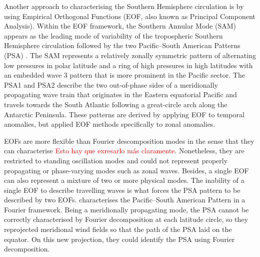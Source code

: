 \documentclass[smallextended]{svjour3}       %
\begin{document}
Another approach to characterising the Southern Hemisphere circulation is by using Empirical Orthogonal Functions (EOF, also known as Principal Component Analysis).
Within the EOF framework, the Southern Annular Mode (SAM) appears as the leading mode of variability of the tropospheric Southern Hemisphere circulation \citep{fogt2020} followed by the two Pacific--South American Patterns (PSA) \citep{mo2001}.
The SAM represents a relatively zonally symmetric pattern of alternating low pressures in polar latitude and a ring of high pressures in high latitudes with an embedded wave 3 pattern that is more prominent in the Pacific sector.
The PSA1 and PSA2 describe the two out-of-phase sides of a meridionally propagating wave train that originates in the Eastern equatorial Pacific and travels towards the South Atlantic following a great-circle arch along the Antarctic Peninsula.
These patterns are derived by applying EOF to temporal anomalies, but \citet{raphael2003} applied EOF methods specifically to zonal anomalies.

EOFs are more flexible than Fourier descomposition modes in the sense that they can characterise \textcolor{red}{Esto hay que exresarlo más claramente}.
Nonetheless, they are restricted to standing oscillation modes and could not represent properly propagating or phase-varying modes such as zonal waves.
Besides, a single EOF can also represent a mixture of two or more physical modes.
The inability of a single EOF to describe travelling waves is what forces the PSA pattern to be described by two EOFs.
\citet{irving2016} characterises the Pacific--South American Pattern in a Fourier framework.
Being a meridionally propagating mode, the PSA cannot be correctly characterised by Fourier decomposition at each latitude circle, so they reprojected meridional wind fields so that the path of the PSA laid on the equator.
On this new projection, they could identify the PSA using Fourier decomposition.
\end{document}
